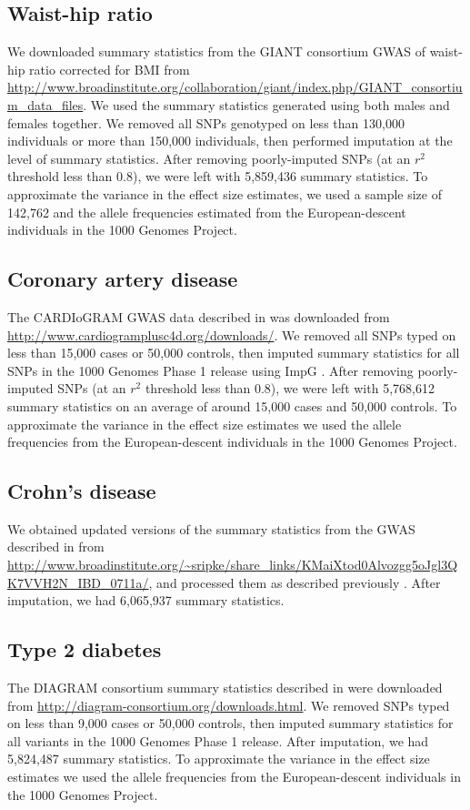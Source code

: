 \documentclass[11pt,titlepage]{article}
\begin{document}
\subsection{Waist-hip ratio}
We downloaded summary statistics from the GIANT consortium GWAS of waist-hip ratio corrected for BMI  \citep{Shungin:2015aa} from \url{http://www.broadinstitute.org/collaboration/giant/index.php/GIANT_consortium_data_files}. We used the summary statistics generated using both males and females together. We removed all SNPs genotyped on less than 130,000 individuals or more than 150,000 individuals, then performed imputation at the level of summary statistics.  After removing poorly-imputed SNPs (at an $r^2$ threshold less than 0.8), we were left with 5,859,436 summary statistics. To approximate the variance in the effect size estimates, we used a sample size of 142,762 and the allele frequencies estimated from the European-descent individuals in the 1000 Genomes Project. 

\subsection{Coronary artery disease}
The CARDIoGRAM GWAS data described in \citet{Schunkert:2011aa} was downloaded from \url{http://www.cardiogramplusc4d.org/downloads/}. We removed all SNPs typed on less than  15,000 cases or 50,000 controls, then imputed summary statistics for all SNPs in the 1000 Genomes Phase 1 release using ImpG \citep{pasaniuc2013fast}. After removing poorly-imputed SNPs (at an $r^2$ threshold less than 0.8), we were left with 5,768,612 summary statistics on an average of around 15,000 cases and 50,000 controls. To approximate the variance in the effect size estimates we used the allele frequencies from the European-descent individuals in the 1000 Genomes Project. 

\subsection{Crohn's disease}
We obtained updated versions of the summary statistics from the GWAS described in \citet{jostins2012host} from \url{http://www.broadinstitute.org/~sripke/share_links/KMaiXtod0Alvozgg5oJgl3QK7VVH2N_IBD_0711a/}, and processed them as described previously \citep{pickrell2013joint}.  After imputation, we had 6,065,937 summary statistics.

\subsection{Type 2 diabetes}
The DIAGRAM consortium summary statistics described in \citep{Morris:2012aa} were downloaded from \url{http://diagram-consortium.org/downloads.html}. We removed SNPs typed on less than 9,000 cases or 50,000 controls, then imputed summary statistics for all variants in the 1000 Genomes Phase 1 release. After imputation, we had 5,824,487 summary statistics. To approximate the variance in the effect size estimates we used the allele frequencies from the European-descent individuals in the 1000 Genomes Project. 
\end{document}
